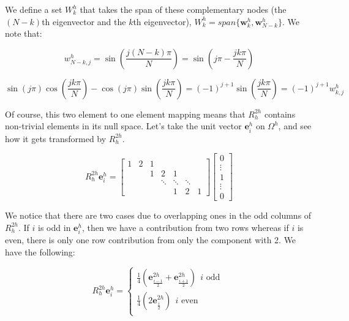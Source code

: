 \documentclass[pdftex,12pt,a4paper]{article}
\begin{document}
We define a set $W_k^h$ that takes the span of these complementary nodes (the $(N-k)$th eigenvector and the $k$th eigenvector), $W_k^h = span \{ \mathbf{w}_k^h, \mathbf{w}_{N-k}^h\}$.  We note that: 

$$
w_{N-k, j}^h = \sin \left( \frac{j (N - k) \pi}{N} \right) = \sin\left( j\pi - \frac{jk \pi}{N}\right)
$$

\begin{equation}
\sin(j \pi) \cos \left( \frac{jk \pi}{N} \right) - \cos(j \pi) \sin\left( \frac{jk \pi}{N} \right) =  (-1)^{j+1}\sin\left( \frac{jk \pi}{N} \right) = (-1)^{j+1} w_{k, j}^h
\end{equation}


Of course, this two element to one element mapping means that $R_h^{2h}$ contains non-trivial elements in its null space.  Let's take the unit vector $\mathbf{e}_i^h$ on $\Omega^h$, and see how it gets transformed by $R_h^{2h}$.  

\begin{equation}
R_h^{2h} \mathbf{e}_i^h = \begin{bmatrix}1 & 2 & 1 \\ & &  1  & 2 & 1 \\ & & & \ddots &\ddots & \ddots \\ & & & & 1 & 2 & 1 \end{bmatrix} \begin{bmatrix} 0 \\ \vdots \\ 1 \\ \vdots \\ 0 \end{bmatrix}
\end{equation}

We notice that there are two cases due to overlapping ones in the odd columns of $R_h^{2h}$.  If $i$ is odd in $\mathbf{e}_i^h$, then we have a contribution from two rows whereas if $i$ is even, there is only one row contribution from only the component with 2.  We have the following: 

\begin{equation}
R_h^{2h} \mathbf{e}_i^h = 
    \begin{cases}
    \frac 1 4 \left( \mathbf{e}_{ \frac{i-1}{2}}^{2h} + \mathbf{e}_{\frac{i+1}{2}}^{2h} \right) ~~ i \text{ odd }\\

    \frac 1 4 \left( 2 \mathbf{e}_{\frac{i}{2}}^{2h} \right) ~~ i \text{ even }\\
    \end{cases}
\end{equation}
\end{document}
